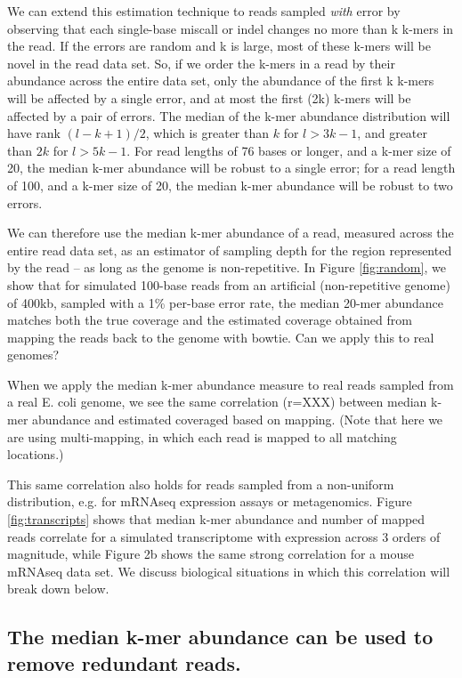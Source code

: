 \documentclass[10pt,draft]{article}
\begin{document}
We can extend this estimation technique to reads sampled {\em with}
error by observing that each single-base miscall or indel changes no
more than k k-mers in the read.  If the errors are random and k is
large, most of these k-mers will be novel in the read data set.  So,
if we order the k-mers in a read by their abundance across the entire
data set, only the abundance of the first k k-mers will be affected by
a single error, and at most the first (2k) k-mers will be affected by
a pair of errors.  The median of the k-mer abundance distribution will
have rank $(l - k + 1) / 2$, which is greater than $k$ for $l > 3k-1$,
and greater than $2k$ for $l > 5k-1$.  For read lengths of 76
bases or longer, and a k-mer size of 20, the median k-mer abundance
will be robust to a single error; for a read length of 100, and a
k-mer size of 20, the median k-mer abundance will be robust to two
errors.

We can therefore use the median k-mer abundance of a read, measured
across the entire read data set, as an estimator of sampling depth for
the region represented by the read -- as long as the genome is
non-repetitive.  In Figure \ref{fig:random}, we show that for
simulated 100-base reads from an artificial (non-repetitive genome) of
400kb, sampled with a 1\% per-base error rate, the median 20-mer
abundance matches both the true coverage and the estimated coverage
obtained from mapping the reads back to the genome with bowtie.  Can
we apply this to real genomes?

When we apply the median k-mer abundance measure to real reads sampled
from a real E. coli genome, we see the same correlation (r=XXX)
between median k-mer abundance and estimated coveraged based on mapping.
(Note that here we are using multi-mapping, in which each read is mapped
to all matching locations.)

This same correlation also holds for reads sampled from a non-uniform
distribution, e.g. for mRNAseq expression assays or metagenomics.
Figure \ref{fig:transcripts} shows that median k-mer abundance and number of mapped reads
correlate for a simulated transcriptome with expression across 3
orders of magnitude, while Figure 2b shows the same strong correlation
for a mouse mRNAseq data set.  We discuss biological situations in which
this correlation will break down below.

\subsection*{The median k-mer abundance can be used to remove redundant reads.}
\end{document}
